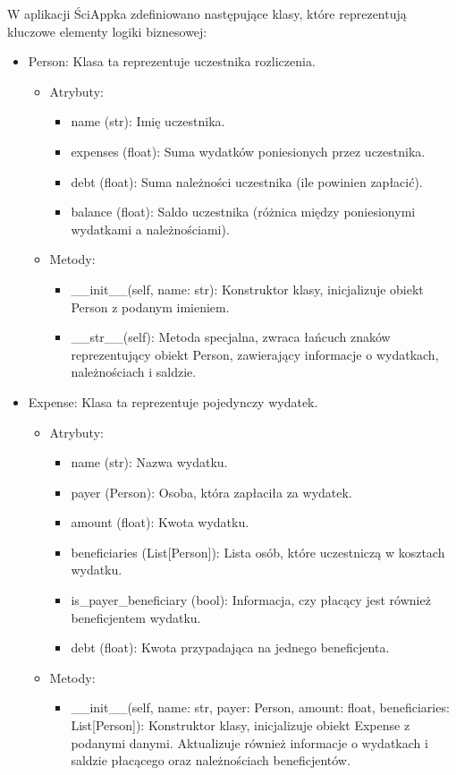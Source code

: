 \documentclass{article}
\begin{document}
W aplikacji ŚciAppka zdefiniowano następujące klasy, które reprezentują kluczowe elementy logiki biznesowej:
\begin{itemize}
\item Person: Klasa ta reprezentuje uczestnika rozliczenia.
\begin{itemize}
\item Atrybuty:
\begin{itemize}
\item name (str): Imię uczestnika.
\item expenses (float): Suma wydatków poniesionych przez uczestnika.
\item debt (float): Suma należności uczestnika (ile powinien zapłacić).
\item balance (float): Saldo uczestnika (różnica między poniesionymi wydatkami a należnościami).
\end{itemize}
\item Metody:
\begin{itemize}
\item \_\_init\_\_(self, name: str): Konstruktor klasy, inicjalizuje obiekt Person z podanym imieniem.
\item \_\_str\_\_(self): Metoda specjalna, zwraca łańcuch znaków reprezentujący obiekt Person, zawierający informacje o wydatkach, należnościach i saldzie.
\end{itemize}
\end{itemize}
\item Expense: Klasa ta reprezentuje pojedynczy wydatek.
\begin{itemize}
\item Atrybuty:
\begin{itemize}
\item name (str): Nazwa wydatku.
\item payer (Person): Osoba, która zapłaciła za wydatek.
\item amount (float): Kwota wydatku.
\item beneficiaries (List[Person]): Lista osób, które uczestniczą w kosztach wydatku.
\item is\_payer\_beneficiary (bool): Informacja, czy płacący jest również beneficjentem wydatku.
\item debt (float): Kwota przypadająca na jednego beneficjenta.
\end{itemize}
\item Metody:
\begin{itemize}
\item \_\_init\_\_(self, name: str, payer: Person, amount: float, beneficiaries: List[Person]): Konstruktor klasy, inicjalizuje obiekt Expense z podanymi danymi. Aktualizuje również informacje o wydatkach i saldzie płacącego oraz należnościach beneficjentów.

\end{itemize}
\end{itemize}
\end{itemize}
\end{document}
